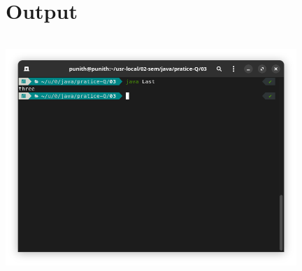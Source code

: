 \documentclass{article}
\begin{document}
 \section*{Output}
\includegraphics[width=11cm, height=9cm]{./images/08.png}
\end{document}
